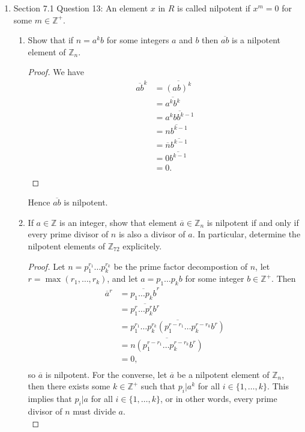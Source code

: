 \documentclass{article}
\begin{document}
\begin{enumerate}[label={\bf Q\arabic*:}]
  \item Section 7.1 Question 13: An element $x$ in $R$ is called nilpotent
    if $x^m=0$ for some $m\in\mathbb{Z}^+$.
    \begin{enumerate}
      \item Show that if $n=a^kb$ for some integers $a$ and $b$ then
        $\overline{ab}$ is a nilpotent element of $\mathbb{Z}_n$.
        \begin{proof}
          We have
          \begin{align*}
            \overline{ab}^k &= \overline{(ab)^k} \\
                            &= \overline{a^kb^k} \\
                            &= \overline{a^kbb^{k-1}} \\
                            &= \overline{nb^{k-1}} \\
                            &= \overline{n}\overline{b^{k-1}} \\
                            &= 0\overline{b^{k-1}} \\
                            &= 0. \\
          \end{align*}
        \end{proof}
        Hence $\overline{ab}$ is nilpotent.

      \item If $a\in\mathbb{Z}$ is an integer, show that element
        $\overline{a}\in\mathbb{Z}_n$ is nilpotent if and only if every
        prime divisor of $n$ is also a divisor of $a$. In particular,
        determine the nilpotent elements of $\mathbb{Z}_{72}$ explicitely.

        \begin{proof}
          Let $n=p_1^{r_1}\ldots p_k^{r_k}$ be the prime factor
          decompostion of $n$, let $r=\max(r_1,\ldots,r_k)$, and let
          $a=p_1\ldots p_k b$ for some integer $b\in\mathbb{Z}^+$. Then
          \begin{align*}
            \overline{a}^r  &= \overline{p_1\ldots p_k b}^r \\
                            &= \overline{p_1^r\ldots p_k^r b^r} \\
                            &= \overline{p_1^{r_1}\ldots
                            p_k^{r_k}(p_1^{r-r_1}\ldots p_k^{r-r_k}b^r)}
                            \\
                            &= \overline{n(p_1^{r-r_1}\ldots
                            p_k^{r-r_k}b^r)} \\
                            &= 0, \\
          \end{align*}
          so $\overline{a}$ is nilpotent. For the converse, let
          $\overline{a}$ be a nilpotent element of $\mathbb{Z}_n$, then
          there exists some $k\in\mathbb{Z}^+$ such that $p_i|a^k$ for all
          $i\in\{1,\ldots,k\}$. This implies that $p_i|a$ for all
          $i\in\{1,\ldots,k\}$, or in other words, every prime divisor of
          $n$ must divide $a$. \\


\end{proof}
\end{enumerate}
\end{enumerate}
\end{document}
